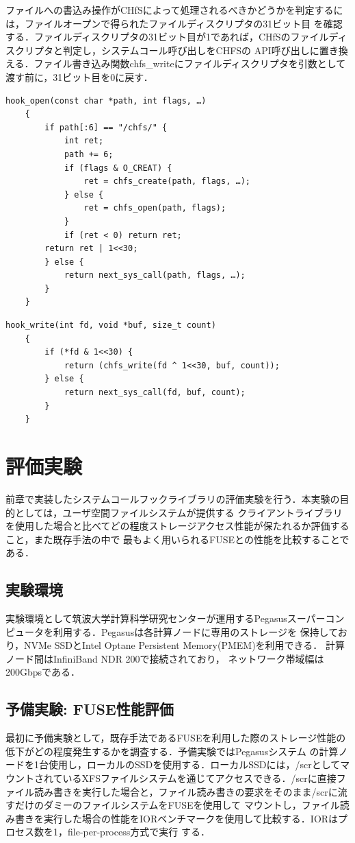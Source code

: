 \documentclass[a4paper,11pt]{jreport}
\begin{document}
ファイルへの書込み操作がCHfSによって処理されるべきかどうかを判定するには，ファイルオープンで得られたファイルディスクリプタの31ビット目
を確認する．ファイルディスクリプタの31ビット目が1であれば，CHfSのファイルディスクリプタと判定し，システムコール呼び出しをCHFSの
API呼び出しに置き換える．ファイル書き込み関数chfs\_writeにファイルディスクリプタを引数として渡す前に，31ビット目を0に戻す．

\newpage

\begin{lstlisting}[caption=openシステムコールフック,label=open]
    hook_open(const char *path, int flags, …)
    {
        if path[:6] == "/chfs/" {
            int ret;
            path += 6;
            if (flags & O_CREAT) {
                ret = chfs_create(path, flags, …);
            } else {
                ret = chfs_open(path, flags);
            }
            if (ret < 0) return ret;
        return ret | 1<<30;
        } else {
            return next_sys_call(path, flags, …);
        }
    }
\end{lstlisting}

\begin{lstlisting}[caption=writeシステムコールフック,label=write]
    hook_write(int fd, void *buf, size_t count)
    {
        if (*fd & 1<<30) {
            return (chfs_write(fd ^ 1<<30, buf, count));
        } else {
            return next_sys_call(fd, buf, count);
        }
    }
\end{lstlisting}

\chapter{評価実験}
前章で実装したシステムコールフックライブラリの評価実験を行う．本実験の目的としては，ユーザ空間ファイルシステムが提供する
クライアントライブラリを使用した場合と比べてどの程度ストレージアクセス性能が保たれるか評価すること，また既存手法の中で
最もよく用いられるFUSEとの性能を比較することである．

\section{実験環境}
実験環境として筑波大学計算科学研究センターが運用するPegasusスーパーコンピュータを利用する．Pegasusは各計算ノードに専用のストレージを
保持しており，NVMe SSDとIntel Optane Persistent Memory(PMEM)を利用できる． 計算ノード間はInfiniBand NDR 200で接続されており，
ネットワーク帯域幅は200Gbpsである．
\section{予備実験: FUSE性能評価}
最初に予備実験として，既存手法であるFUSEを利用した際のストレージ性能の低下がどの程度発生するかを調査する．予備実験ではPegasusシステム
の計算ノードを1台使用し，ローカルのSSDを使用する．ローカルSSDには，/scrとしてマウントされているXFSファイルシステムを通じてアクセスできる．/scrに直接ファイル読み書きを実行した場合と，ファイル読み書きの要求をそのまま/scrに流すだけのダミーのファイルシステムをFUSEを使用して
マウントし，ファイル読み書きを実行した場合の性能をIORベンチマークを使用して比較する．IORはプロセス数を1，file-per-process方式で実行
する．
\end{document}
